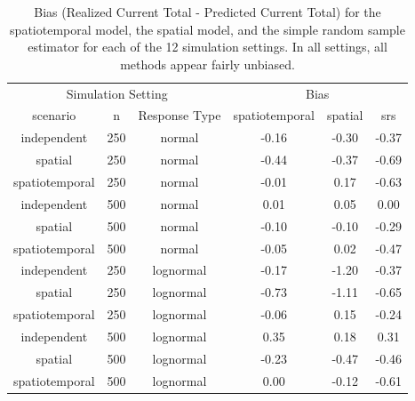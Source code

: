\documentclass[]{interact}
\theoremstyle{plain}%
\theoremstyle{definition}
\theoremstyle{remark}
\begin{document}
\begin{table}[H]

\caption{\label{tab:simbiastab}Bias (Realized Current Total - Predicted Current Total) for the spatiotemporal model, the spatial model, and the simple random sample estimator for each of the 12 simulation settings. In all settings, all methods appear fairly unbiased.}
\centering
\begin{tabular}[t]{cccccc}
\toprule
\multicolumn{3}{c}{Simulation Setting} & \multicolumn{3}{c}{Bias} \\
\cmidrule(l{3pt}r{3pt}){1-3} \cmidrule(l{3pt}r{3pt}){4-6}
scenario & n & Response Type & spatiotemporal & spatial & srs\\
\midrule
independent & 250 & normal & -0.16 & -0.30 & -0.37\\
spatial & 250 & normal & -0.44 & -0.37 & -0.69\\
spatiotemporal & 250 & normal & -0.01 & 0.17 & -0.63\\
\midrule
independent & 500 & normal & 0.01 & 0.05 & 0.00\\
spatial & 500 & normal & -0.10 & -0.10 & -0.29\\
spatiotemporal & 500 & normal & -0.05 & 0.02 & -0.47\\
\midrule
independent & 250 & lognormal & -0.17 & -1.20 & -0.37\\
spatial & 250 & lognormal & -0.73 & -1.11 & -0.65\\
spatiotemporal & 250 & lognormal & -0.06 & 0.15 & -0.24\\
\midrule
independent & 500 & lognormal & 0.35 & 0.18 & 0.31\\
spatial & 500 & lognormal & -0.23 & -0.47 & -0.46\\
spatiotemporal & 500 & lognormal & 0.00 & -0.12 & -0.61\\
\bottomrule
\end{tabular}
\end{table}
\end{document}
